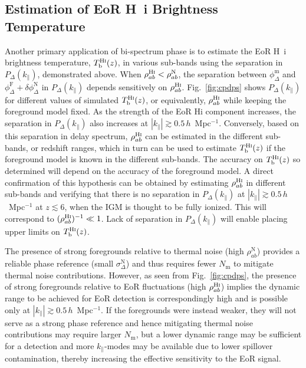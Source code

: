 \documentclass[
reprint,
superscriptaddress,
amsmath,
amssymb,
aps,
prd
]{revtex4-1}
\begin{document}
\subsection{Estimation of EoR H~{\sc i} Brightness Temperature}\label{sec:spin-temp}

Another primary application of bi-spectrum phase is to estimate the EoR H~{\sc i} brightness temperature, $T_\textrm{b}^\textrm{H{\sc i}}(z)$, in various sub-bands using the separation in $P_\Delta(k_\parallel)$, demonstrated above. When $\rho_{ab}^\textrm{H{\sc i}} < \rho_{ab}^\textrm{N}$, the separation between $\phi_\Delta^\textrm{m}$ and $\phi_\Delta^\textrm{F} + \delta\phi_\Delta^\textrm{N}$ in $P_\Delta(k_\parallel)$ depends sensitively on $\rho_{ab}^\textrm{H{\sc i}}$. Fig.~\ref{fig:cpdps} shows $P_\Delta(k_\parallel)$ for different values of simulated $T_\textrm{b}^\textrm{H{\sc i}}(z)$, or equivalently, $\rho_{ab}^\textrm{H{\sc i}}$ while keeping the foreground model fixed. As the strength of the EoR H{\sc i} component increases, the separation in $P_\Delta(k_\parallel)$ also increases at $|k_\parallel| \gtrsim 0.5\,h$~Mpc$^{-1}$. Conversely, based on this separation in delay spectrum, $\rho_{ab}^\textrm{H{\sc i}}$ can be estimated in the different sub-bands, or redshift ranges, which in turn can be used to estimate $T_\textrm{b}^\textrm{H{\sc i}}(z)$ if the foreground model is known in the different sub-bands. The accuracy on $T_\textrm{b}^\textrm{H{\sc i}}(z)$ so determined will depend on the accuracy of the foreground model. A direct confirmation of this hypothesis can be obtained by estimating $\rho_{ab}^\textrm{H{\sc i}}$ in different sub-bands and verifying that there is no separation in $P_\Delta(k_\parallel)$ at $|k_\parallel| \gtrsim 0.5\,h$~Mpc$^{-1}$ at $z\lesssim 6$, when the IGM is thought to be fully ionized. This will correspond to $(\rho_{ab}^\textrm{H{\sc i}})^{-1} \ll 1$. Lack of separation in $P_\Delta(k_\parallel)$ will enable placing upper limits on $T_\textrm{b}^\textrm{H{\sc i}}(z)$.

The presence of strong foregrounds relative to thermal noise (high $\rho_{ab}^\textrm{N}$) provides a reliable phase reference (small $\sigma_\Delta^\textrm{N}$) and thus requires fewer $N_\textrm{m}$ to mitigate thermal noise contributions. However, as seen from Fig.~\ref{fig:cpdps}, the presence of strong foregrounds relative to EoR fluctuations (high $\rho_{ab}^\textrm{H{\sc i}}$) implies the dynamic range to be achieved for EoR detection is correspondingly high and is possible only at $|k_\parallel| \gtrsim 0.5\,h$~Mpc$^{-1}$. If the foregrounds were instead weaker, they will not serve as a strong phase reference and hence mitigating thermal noise contributions may require larger $N_\textrm{m}$, but a lower dynamic range may be sufficient for a detection and more $k_\parallel$-modes may be available due to lower spillover contamination, thereby increasing the effective sensitivity to the EoR signal. 
\end{document}
